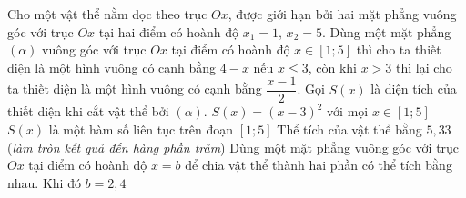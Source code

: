 \begin{ex}%
	Cho một vật thể nằm dọc theo trục $Ox$, được giới hạn bởi hai mặt phẳng vuông góc với trục $Ox$ tại hai điểm có hoành độ $x_1 = 1$, $x_2 = 5$. Dùng một mặt phẳng $(\alpha)$ vuông góc với trục $Ox$ tại điểm có hoành độ $x \in [1;5]$ thì cho ta thiết diện là một hình
	vuông có cạnh bằng $4-x$ nếu $x \le 3$, còn khi $x > 3$ thì lại cho ta thiết diện là một hình vuông có cạnh bằng $\dfrac{x-1}{2}$. Gọi $S(x)$ là diện tích của thiết diện khi cắt vật thể bởi $(\alpha)$.
	\choiceTF
	{$S(x)=(x-3)^2$ với mọi $x \in [1;5]$}
	{\True $S(x)$ là một hàm số liên tục trên đoạn $[1;5]$}
	{Thể tích của vật thể bằng $5{,}33$ (\textit{làm tròn kết quả đến hàng phần trăm})}
	{Dùng một mặt phẳng vuông góc với trục $Ox$ tại điểm có hoành độ $x = b$ để chia vật thể thành hai phần có thể tích bằng nhau. Khi đó $b = 2{,}4$}
\end{ex}
